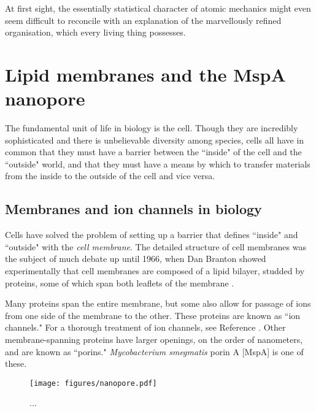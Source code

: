 \begin{savequote}[75mm]
At first sight, the essentially statistical character of atomic mechanics might even seem difficult to reconcile with an explanation of the marvellously refined organisation, which every living thing possesses.
\end{savequote}

\chapter{Lipid membranes and the MspA nanopore}
\label{lipids_mspa}

The fundamental unit of life in biology is the cell.  Though they are incredibly sophisticated and there is unbelievable diversity among species, cells all have in common that they must have a barrier between the ``inside" of the cell and the ``outside" world, and that they must have a means by which to transfer materials from the inside to the outside of the cell and vice versa.

\section{Membranes and ion channels in biology}

Cells have solved the problem of setting up a barrier that defines ``inside" and ``outside" with the \textit{cell membrane}.  The detailed structure of cell membranes was the subject of much debate up until 1966, when Dan Branton showed experimentally that cell membranes are composed of a lipid bilayer, studded by proteins, some of which span both leaflets of the membrane \citep{Branton1966}.

Many proteins span the entire membrane, but some also allow for passage of ions from one side of the membrane to the other.  These proteins are known as ``ion channels."  For a thorough treatment of ion channels, see Reference .  Other membrane-spanning proteins have larger openings, on the order of nanometers, and are known as ``porins."  \textit{Mycobacterium smegmatis} porin A [MspA] is one of these.

\begin{figure}[h]
\begin{centering}
\texttt{[image: figures/nanopore.pdf]}
\caption[Ion channels in cells]{...}
\label{fig:ion_channels}
\end{centering}
\end{figure}

